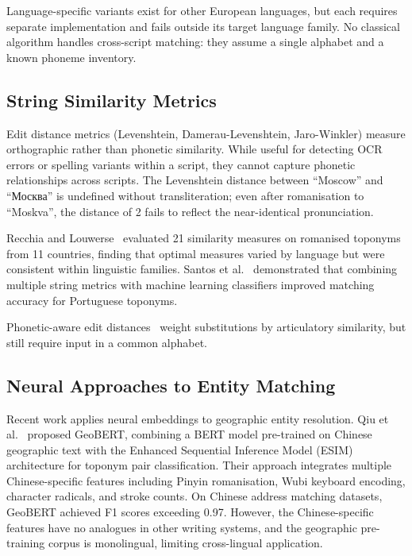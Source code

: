 \documentclass[11pt,a4paper]{article}
\begin{document}
Language-specific variants exist for other European languages, but each requires separate implementation and fails outside its target language family. No classical algorithm handles cross-script matching: they assume a single alphabet and a known phoneme inventory.

\subsection{String Similarity Metrics}

Edit distance metrics (Levenshtein, Damerau-Levenshtein, Jaro-Winkler) measure orthographic rather than phonetic similarity. While useful for detecting OCR errors or spelling variants within a script, they cannot capture phonetic relationships across scripts. The Levenshtein distance between ``Moscow'' and ``Москва'' is undefined without transliteration; even after romanisation to ``Moskva'', the distance of 2 fails to reflect the near-identical pronunciation.

Recchia and Louwerse~\citep{recchia2013} evaluated 21 similarity measures on romanised toponyms from 11 countries, finding that optimal measures varied by language but were consistent within linguistic families. Santos et al.~\citep{santos2018} demonstrated that combining multiple string metrics with machine learning classifiers improved matching accuracy for Portuguese toponyms.

Phonetic-aware edit distances~\citep{kondrak2000} weight substitutions by articulatory similarity, but still require input in a common alphabet.

\subsection{Neural Approaches to Entity Matching}

Recent work applies neural embeddings to geographic entity resolution. Qiu et al.~\citep{qiu2024geobert} proposed GeoBERT, combining a BERT model pre-trained on Chinese geographic text with the Enhanced Sequential Inference Model (ESIM) architecture for toponym pair classification. Their approach integrates multiple Chinese-specific features including Pinyin romanisation, Wubi keyboard encoding, character radicals, and stroke counts. On Chinese address matching datasets, GeoBERT achieved F1 scores exceeding 0.97. However, the Chinese-specific features have no analogues in other writing systems, and the geographic pre-training corpus is monolingual, limiting cross-lingual application.
\end{document}
